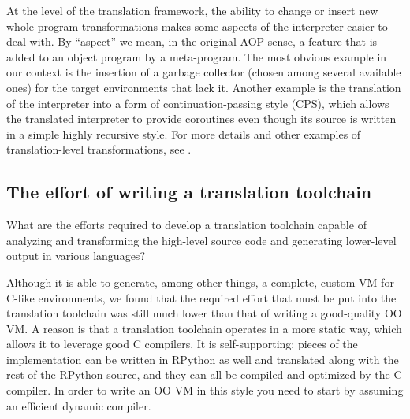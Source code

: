 \documentclass{llncs}
\begin{document}
At the level of the translation framework, the ability to change or
insert new whole-program transformations makes some aspects of the
interpreter easier to deal with.  By ``aspect'' we mean, in the original
AOP sense, a feature that is added to an object program by a
meta-program.  The most obvious example in our context is the insertion
of a garbage collector (chosen among several available ones) for the
target environments that lack it.  Another example is the translation of
the interpreter into a form of continuation-passing style (CPS), which
allows the translated interpreter to provide coroutines even though its
source is written in a simple highly recursive style.  For more details
and other examples of translation-level transformations, see
\cite{D07.1}.


\subsection{The effort of writing a translation toolchain}

What are the efforts required to develop a translation toolchain capable
of analyzing and transforming the high-level source code and generating
lower-level output in various languages?

Although it is able to generate, among other things, a complete, custom
VM for C-like environments, we found that the required effort that must
be put into the translation toolchain was still much lower than that of
writing a good-quality OO VM.  A reason is that a translation toolchain
operates in a more static way, which allows it to leverage good C
compilers.  It is self-supporting: pieces of the implementation can be
written in RPython as well and translated along with the rest of the
RPython source, and they can all be compiled and optimized by the C
compiler.  In order to write an OO VM in this style you need to start by
assuming an efficient dynamic compiler.
\end{document}
